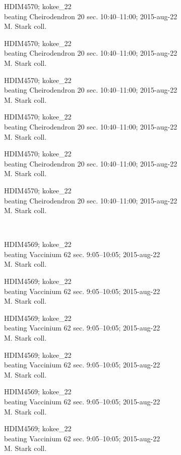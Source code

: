 \documentclass[2pt]{extarticle}
\begin{document}
\noindent
\parbox{0.16\textwidth}{\tiny \raggedright \rule[-0.3\baselineskip]{0pt}{10pt}HDIM4570; kokee\_22\\ beating Cheirodendron 20 sec. 10:40--11:00; 2015-aug-22\\ M. Stark coll.}
\parbox{0.16\textwidth}{\tiny \raggedright \rule[-0.3\baselineskip]{0pt}{10pt}HDIM4570; kokee\_22\\ beating Cheirodendron 20 sec. 10:40--11:00; 2015-aug-22\\ M. Stark coll.}
\parbox{0.16\textwidth}{\tiny \raggedright \rule[-0.3\baselineskip]{0pt}{10pt}HDIM4570; kokee\_22\\ beating Cheirodendron 20 sec. 10:40--11:00; 2015-aug-22\\ M. Stark coll.}
\parbox{0.16\textwidth}{\tiny \raggedright \rule[-0.3\baselineskip]{0pt}{10pt}HDIM4570; kokee\_22\\ beating Cheirodendron 20 sec. 10:40--11:00; 2015-aug-22\\ M. Stark coll.}
\parbox{0.16\textwidth}{\tiny \raggedright \rule[-0.3\baselineskip]{0pt}{10pt}HDIM4570; kokee\_22\\ beating Cheirodendron 20 sec. 10:40--11:00; 2015-aug-22\\ M. Stark coll.}
\parbox{0.16\textwidth}{\tiny \raggedright \rule[-0.3\baselineskip]{0pt}{10pt}HDIM4570; kokee\_22\\ beating Cheirodendron 20 sec. 10:40--11:00; 2015-aug-22\\ M. Stark coll.} \\ 
\vspace{0.001in} 

\noindent
\parbox{0.16\textwidth}{\tiny \raggedright \rule[-0.3\baselineskip]{0pt}{10pt}HDIM4569; kokee\_22\\ beating Vaccinium 62 sec. 9:05--10:05; 2015-aug-22\\ M. Stark coll.}
\parbox{0.16\textwidth}{\tiny \raggedright \rule[-0.3\baselineskip]{0pt}{10pt}HDIM4569; kokee\_22\\ beating Vaccinium 62 sec. 9:05--10:05; 2015-aug-22\\ M. Stark coll.}
\parbox{0.16\textwidth}{\tiny \raggedright \rule[-0.3\baselineskip]{0pt}{10pt}HDIM4569; kokee\_22\\ beating Vaccinium 62 sec. 9:05--10:05; 2015-aug-22\\ M. Stark coll.}
\parbox{0.16\textwidth}{\tiny \raggedright \rule[-0.3\baselineskip]{0pt}{10pt}HDIM4569; kokee\_22\\ beating Vaccinium 62 sec. 9:05--10:05; 2015-aug-22\\ M. Stark coll.}
\parbox{0.16\textwidth}{\tiny \raggedright \rule[-0.3\baselineskip]{0pt}{10pt}HDIM4569; kokee\_22\\ beating Vaccinium 62 sec. 9:05--10:05; 2015-aug-22\\ M. Stark coll.}
\parbox{0.16\textwidth}{\tiny \raggedright \rule[-0.3\baselineskip]{0pt}{10pt}HDIM4569; kokee\_22\\ beating Vaccinium 62 sec. 9:05--10:05; 2015-aug-22\\ M. Stark coll.} \\ 
\vspace{0.001in} 
\end{document}
